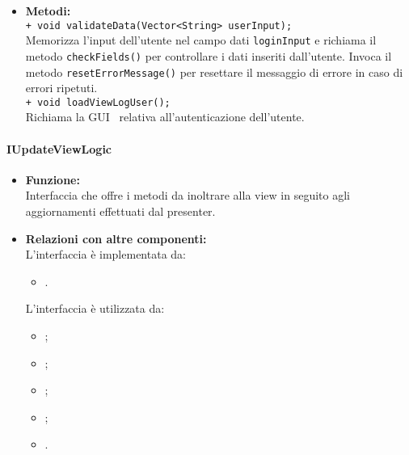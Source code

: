 {{\begin{sloppypar}
{{{\begin{itemize}
				\item[] \textbf{Metodi:}{\\
					\texttt{+ void validateData(Vector<String> userInput);}\\
					Memorizza l'input dell'utente nel campo dati \texttt{loginInput} e richiama il metodo \texttt{checkFields()} per controllare i dati inseriti dall'utente. Invoca il metodo \texttt{resetErrorMessage()} per resettare il messaggio di errore in caso di errori ripetuti.\\
					
					\texttt{+ void loadViewLogUser();}\\
					Richiama la GUI\g~ relativa all'autenticazione dell'utente.\\
				}
			\end{itemize}
			}
		

			\paragraph{IUpdateViewLogic}\label{par:IUpdateViewLogic}{
			\begin{itemize}
			
				\item[] \textbf{Funzione:}\\
				Interfaccia che offre i metodi da inoltrare alla view in seguito agli aggiornamenti effettuati dal presenter.\\
			
				\item[] \textbf{Relazioni con altre componenti:}\\
				L'interfaccia è implementata da:
				\begin{itemize}
				 	\item[]	.
				\end{itemize}
				L'interfaccia è utilizzata da:
				\begin{itemize}
					\item[] ;
					\item[] ;
					\item[] ;
					\item[] ;
					\item[] .\\
				\end{itemize}
			

\end{itemize}}}}
\end{sloppypar}}}
